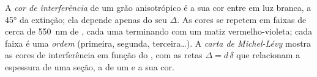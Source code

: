 \begin{definition}\label{def:b1:optical-mineralogy:interference-colour}
A \emph{cor de interferência} de um grão anisotrópico é a sua cor entre  em luz branca, a \ang{45} da extinção; ela depende apenas do seu  $\Delta$. As cores se repetem em faixas de cerca de \qty{550}{nm} de , cada uma terminando com um matiz vermelho-violeta; cada faixa é uma \emph{ordem} (primeira, segunda, terceira\dots). A \emph{carta de Michel-Lévy} mostra as cores de interferência em função do , com as retas $\Delta = d\,\delta$ que relacionam a espessura de uma seção, a  de um  e a sua cor.
\end{definition}

